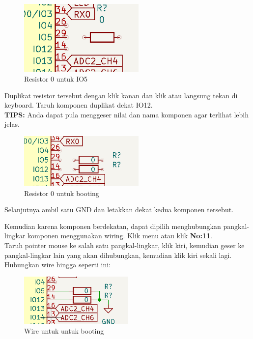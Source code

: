 \documentclass[12pt]{book}
\begin{document}
	\begin{figure}[!ht]
		\centering
		\includegraphics[width=0.55\textwidth]{images/sch/sch_12}
		\caption{Resistor 0 untuk IO5}
	\end{figure}

	Duplikat resistor tersebut dengan klik kanan dan klik 
	atau langsung tekan  di keyboard.
	Taruh komponen duplikat dekat IO12.\\

	\textbf{TIPS:} Anda dapat pula menggeser nilai dan nama komponen agar terlihat lebih jelas.

	\begin{figure}[!ht]
		\centering
		\includegraphics[width=0.55\textwidth]{images/sch/sch_13}
		\caption{Resistor 0 untuk booting}
	\end{figure}

	Selanjutnya ambil satu GND dan letakkan dekat kedua komponen tersebut.

	\newpage
	Kemudian karena komponen berdekatan, dapat dipilih menghubungkan pangkal-lingkar komponen
	menggunakan wiring.
	Klik menu  atau klik \textbf{No:11}.\\

	Taruh pointer mouse ke salah satu pangkal-lingkar, klik kiri,
	kemudian geser ke pangkal-lingkar lain yang akan dihubungkan, kemudian klik kiri sekali lagi.\\

	Hubungkan wire hingga seperti ini:

	\begin{figure}[!ht]
		\centering
		\includegraphics[width=0.5\textwidth]{images/sch/sch_14}
		\caption{Wire untuk untuk booting}
	\end{figure}
\end{document}
